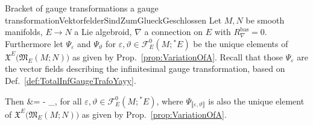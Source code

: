 \documentclass[a4paper,oneside,11pt]{scrartcl} %
\def\ba#1\ea{\begin{align}#1\end{align}}
\theoremstyle{plain}
\theoremstyle{remark}
\theoremstyle{definition}
\begin{document}
\begin{theorems}{Bracket of gauge transformations a gauge transformation}{VektorfelderSindZumGlueckGeschlossen}
Let $M, N$ be smooth manifolds, $E \to N$ a Lie algebroid, $\nabla$ a connection on $E$ with $R^{\mathrm{bas}}_\nabla=0$. Furthermore let $\Psi_\varepsilon$ and $\Psi_\vartheta$ for $\varepsilon, \vartheta \in \mathcal{F}^0_E(M; {}^*E)$ be the unique elements of $\mathfrak{X}^E\bigl( \mathfrak{M}_E(M;N) \bigr)$ as given by Prop.~\ref{prop:VariationOfA}. Recall that those $\Psi_\varepsilon$ are the vector fields describing the infinitesimal gauge transformation, based on Def.~\ref{def:TotalInfGaugeTrafoYayy}.

Then
\ba
\mleft[ \Psi_\varepsilon, \Psi_\vartheta \mright]
&=
- \Psi_{\llbracket\varepsilon, \vartheta \rrbracket}
\ea
for all $\varepsilon, \vartheta \in \mathcal{F}^0_E(M; {}^*E)$, where $\Psi_{\llbracket\varepsilon, \vartheta\rrbracket}$ is also the unique element of $\mathfrak{X}^E\bigl( \mathfrak{M}_E(M;N) \bigr)$ as given by Prop.~\ref{prop:VariationOfA}.
\end{theorems}
\end{document}
